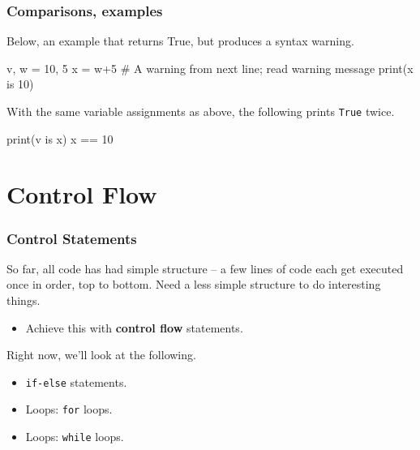 \documentclass{beamer}
\newenvironment{codeblock}
    {\hfill\begin{beamerboxesrounded}[lower=codecol, width=0.8\textwidth]
    \medskip

    }
    { 
    \end{beamerboxesrounded}\hfill
    }
\theoremstyle{example}
\newcommand{\ttt}[1]{{\small\texttt{#1}}}
\begin{document}
\begin{frame}[fragile]
\frametitle{Comparisons, examples}
Below, an example that returns True, but produces a syntax warning.
\vspace*{12pt}

\begin{codeblock}

\begin{python}
v, w = 10, 5
x = w+5
# A warning from next line; read warning message
print(x is 10)
\end{python}

\end{codeblock}

\vfill
With the same variable assignments as above, the following prints \ttt{True} twice.
\vspace*{12pt}

\begin{codeblock}

\begin{python}
print(v is x)
x == 10
\end{python}

\end{codeblock}
	
\end{frame}

\section{Control Flow}

\begin{frame}
\frametitle{Control Statements}
So far, all code has had simple structure {--} a few lines of code each get executed once in order, top to bottom. Need a less simple structure to do interesting things. 
\begin{itemize}
    \item[] Achieve this with \textbf{control flow} statements.
\end{itemize}

Right now, we'll look at the following.
\begin{itemize}
	\item \ttt{if-else} statements.
	\item Loops: \ttt{for} loops.
	\item Loops: \ttt{while} loops.
\end{itemize}
\end{frame}
\end{document}
